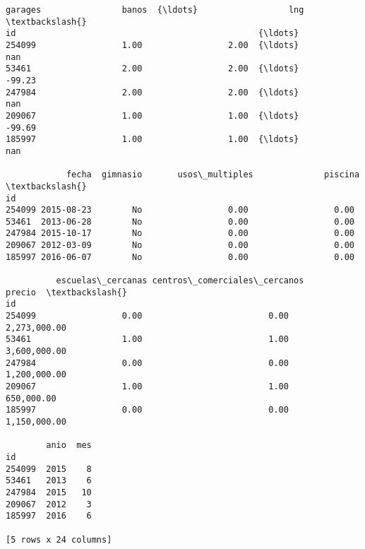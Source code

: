 \documentclass[11pt]{article}
\begin{document}
\begin{tcolorbox}[breakable, boxrule=.5pt, size=fbox, pad at break*=1mm, opacityfill=0]
\begin{Verbatim}[commandchars=\\\{\}]
                    garages                banos  {\ldots}                  lng  \textbackslash{}
id                                                {\ldots}
254099                 1.00                 2.00  {\ldots}                  nan
53461                  2.00                 2.00  {\ldots}               -99.23
247984                 2.00                 2.00  {\ldots}                  nan
209067                 1.00                 1.00  {\ldots}               -99.69
185997                 1.00                 1.00  {\ldots}                  nan

            fecha  gimnasio       usos\_multiples              piscina  \textbackslash{}
id
254099 2015-08-23        No                 0.00                 0.00
53461  2013-06-28        No                 0.00                 0.00
247984 2015-10-17        No                 0.00                 0.00
209067 2012-03-09        No                 0.00                 0.00
185997 2016-06-07        No                 0.00                 0.00

          escuelas\_cercanas centros\_comerciales\_cercanos               precio  \textbackslash{}
id
254099                 0.00                         0.00         2,273,000.00
53461                  1.00                         1.00         3,600,000.00
247984                 0.00                         0.00         1,200,000.00
209067                 1.00                         1.00           650,000.00
185997                 0.00                         0.00         1,150,000.00

        anio  mes
id
254099  2015    8
53461   2013    6
247984  2015   10
209067  2012    3
185997  2016    6

[5 rows x 24 columns]
\end{Verbatim}
\end{tcolorbox}
        
\end{document}

